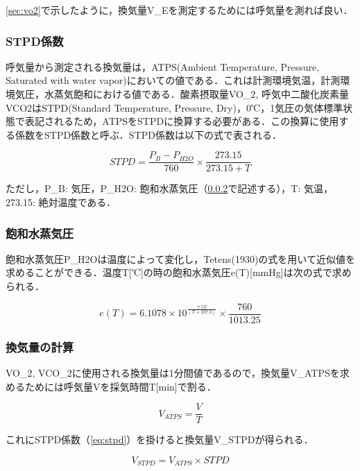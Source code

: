 \ref{sec:vo2}で示したように，換気量V_Eを測定するためには呼気量を測れば良い．



\subsubsection{STPD係数}
\label{sec:stpd}

呼気量から測定される換気量は，ATPS(Ambient Temperature, Pressure, Saturated with water vapor)においての値である．これは計測環境気温，計測環境気圧，水蒸気飽和における値である．酸素摂取量VO_2, 呼気中二酸化炭素量VCO2はSTPD(Standard Temperature, Pressure, Dry)，0℃，1気圧の気体標準状態で表記されるため，ATPSをSTPDに換算する必要がある．この換算に使用する係数をSTPD係数と呼ぶ．STPD係数は以下の式で表される．

\begin{equation}
  \label{eq:stpd}
  STPD = \frac{P_B - P_{H2O}}{760} \times　\frac{273.15}{273.15 + T}
\end{equation}

ただし，P_B: 気圧，P_{H2O}: 飽和水蒸気圧（\ref{sec:swvp}で記述する），T: 気温，273.15: 絶対温度である．

\subsubsection{飽和水蒸気圧}
\label{sec:swvp}

飽和水蒸気圧P_{H2O}は温度によって変化し，Tetens(1930)の式を用いて近似値を求めることができる．温度T[℃]の時の飽和水蒸気圧e(T)[mmHg]は次の式で求められる．

\begin{equation}
  e(T) = 6.1078 \times 10 ^ \frac{7.5T}{(T + 237.3)} \times \frac{760}{1013.25}
\end{equation}

\subsubsection{換気量の計算}

VO_2, VCO_2に使用される換気量は1分間値であるので，換気量V_{ATPS}を求めるためには呼気量Vを採気時間T[min]で割る．

\begin{equation}
  V_{ATPS} = \frac{V}{T}
\end{equation}

これにSTPD係数（\ref{eq:stpd}）を掛けると換気量V_{STPD}が得られる．

\begin{equation}
  V_{STPD} = V_{ATPS} \times STPD
\end{equation}

